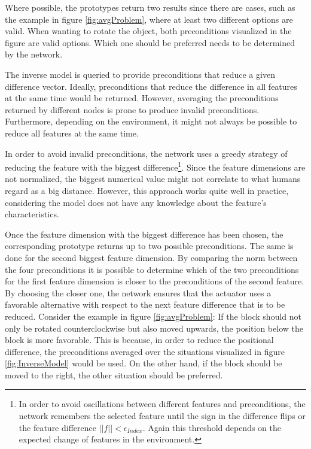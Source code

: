 Where possible, the prototypes return two results since there are cases, such as the example in figure \ref{fig:avgProblem}, where at least two different options are valid. When wanting to rotate the object, both preconditions visualized in the figure are valid options. Which one should be preferred needs to be determined by the network.

The inverse model is queried to provide preconditions that reduce a given difference vector. Ideally, preconditions that reduce the difference in all features at the same time would be returned. 
However, averaging the preconditions returned by different nodes is prone to produce invalid preconditions. 
Furthermore, depending on the environment, it might not always be possible to reduce all features at the same time. 

In order to avoid invalid preconditions, the network uses a greedy strategy of reducing the feature with the biggest difference\footnote{In order to avoid oscillations between different features and preconditions, the network remembers the selected feature until the sign in the difference flips or the feature difference $||f|| < \epsilon_{Index}$. Again this threshold depends on the expected change of features in the environment.}. Since the feature dimensions are not normalized, the biggest numerical value might not correlate to what humans regard as a big distance. 
However, this approach works quite well in practice, considering the model does not have any knowledge about the feature's characteristics. 

Once the feature dimension with the biggest difference has been chosen, the corresponding prototype returns up to two possible preconditions. The same is done for the second biggest feature dimension. By comparing the norm between the four preconditions it is possible to determine which of the two preconditions for the first feature dimension is closer to the preconditions of the second feature. By choosing the closer one, the network ensures that the actuator uses a favorable alternative with respect to the next feature difference that is to be reduced. Consider the example in figure \ref{fig:avgProblem}: If the block should not only be rotated counterclockwise but also moved upwards, the position below the block is more favorable. This is because, in order to reduce the positional difference, the preconditions averaged over the situations visualized in figure \ref{fig:InverseModel} would be used. On the other hand, if the block should be moved to the right, the other situation should be preferred. %


